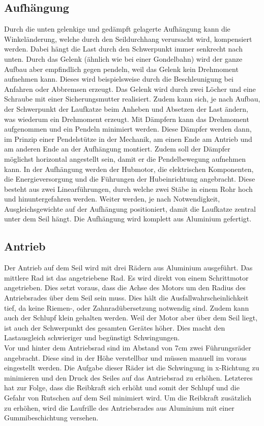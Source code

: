 \documentclass[a4paper]{report}
\begin{document}
\subsection{Aufhängung}
Durch die unten gelenkige und gedämpft gelagerte Aufhängung kann die Winkeländerung, welche durch den Seildurchhang verursacht wird, kompensiert werden. Dabei hängt die Last durch den Schwerpunkt immer senkrecht nach unten. Durch das Gelenk (ähnlich wie bei einer Gondelbahn) wird der ganze Aufbau aber empfindlich gegen pendeln, weil das Gelenk kein Drehmoment aufnehmen kann. Dieses wird beispielsweise durch die Beschleunigung bei Anfahren oder Abbremsen erzeugt. Das Gelenk wird durch zwei Löcher und eine Schraube mit einer Sicherungsmutter realisiert. Zudem kann sich, je nach Aufbau, der Schwerpunkt der Laufkatze beim Anheben und Absetzen der Last ändern, was wiederum ein Drehmoment erzeugt. Mit Dämpfern kann das Drehmoment aufgenommen und ein Pendeln minimiert werden. Diese Dämpfer werden dann, im Prinzip einer Pendelstütze in der Mechanik, am einen Ende am Antrieb und am anderen Ende an der Aufhängung montiert. Zudem soll der Dämpfer möglichst horizontal angestellt sein, damit er die Pendelbewegung aufnehmen kann. In der Aufhängung werden der Hubmotor, die elektrischen Komponenten, die Energieversorgung und die Führungen der Hubeinrichtung angebracht. Diese besteht aus zwei Linearführungen, durch welche zwei Stäbe in einem Rohr hoch und hinuntergefahren werden. Weiter werden, je nach Notwendigkeit, Ausgleichsgewichte auf der Aufhängung positioniert, damit die Laufkatze zentral unter dem Seil hängt. Die Aufhängung wird komplett aus Aluminium gefertigt.

\subsection{Antrieb}
Der Antrieb auf dem Seil wird mit drei Rädern aus Aluminium ausgeführt. Das mittlere Rad ist das angetriebene Rad. Es wird direkt von einem Schrittmotor angetrieben. Dies setzt voraus, dass die Achse des Motors um den Radius des Antriebsrades über dem Seil sein muss. Dies hält die Ausfallwahrscheinlichkeit tief, da keine Riemen-, oder Zahnradübersetzung notwendig sind. Zudem kann auch der Schlupf klein gehalten werden. Weil der Motor aber über dem Seil liegt, ist auch der Schwerpunkt des gesamten Gerätes höher. Dies macht den Lastausgleich schwieriger und begünstigt Schwingungen.
\\
Vor und hinter dem Antriebsrad sind im Abstand von 7cm zwei Führungsräder angebracht. Diese sind in der Höhe verstellbar und müssen manuell im voraus eingestellt werden. Die Aufgabe dieser Räder ist die Schwingung in x-Richtung zu minimieren und den Druck des Seiles auf das Antriebsrad zu erhöhen. Letzteres hat zur Folge, dass die Reibkraft sich erhöht und somit der Schlupf und die Gefahr von Rutschen auf dem Seil minimiert wird. Um die Reibkraft zusätzlich zu erhöhen, wird die Laufrille des Antriebsrades aus Aluminium mit einer Gummibeschichtung versehen.
\end{document}
